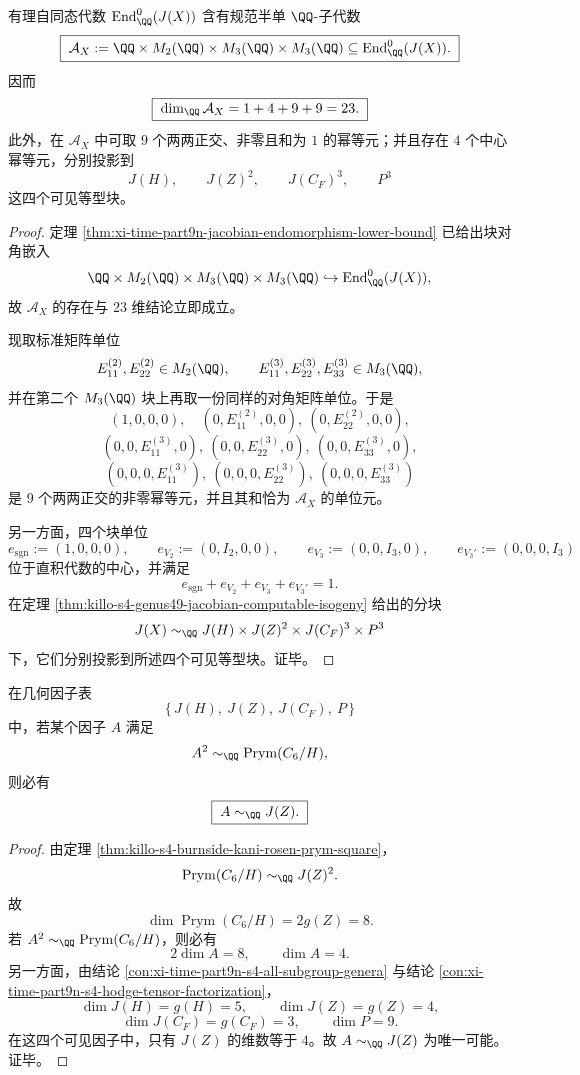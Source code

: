 \begin{theorem}\label{thm:xi-time-part9n1b-jacobian-projector-idempotent-algebra}
有理自同态代数 \(\operatorname{End}^0_{\QQ}(J(X))\) 含有规范半单 \(\QQ\)-子代数
\[
\boxed{\;
\mathcal A_X:=\QQ\times M_2(\QQ)\times M_3(\QQ)\times M_3(\QQ)
\subseteq \operatorname{End}^0_{\QQ}(J(X)).\;}
\]
因而
\[
\boxed{\;\dim_{\QQ}\mathcal A_X=1+4+9+9=23.\;}
\]
此外，在 \(\mathcal A_X\) 中可取 \(9\) 个两两正交、非零且和为 \(1\) 的幂等元；并且存在 \(4\) 个中心幂等元，分别投影到
\[
J(H),\qquad J(Z)^2,\qquad J(C_F)^3,\qquad P^3
\]
这四个可见等型块。
\end{theorem}
\begin{proof}
定理 \ref{thm:xi-time-part9n-jacobian-endomorphism-lower-bound} 已给出块对角嵌入
\[
\QQ\times M_2(\QQ)\times M_3(\QQ)\times M_3(\QQ)
\hookrightarrow
\operatorname{End}^0_{\QQ}(J(X)),
\]
故 \(\mathcal A_X\) 的存在与 \(23\) 维结论立即成立。

现取标准矩阵单位
\[
E_{11}^{(2)},E_{22}^{(2)}\in M_2(\QQ),
\qquad
E_{11}^{(3)},E_{22}^{(3)},E_{33}^{(3)}\in M_3(\QQ),
\]
并在第二个 \(M_3(\QQ)\) 块上再取一份同样的对角矩阵单位。于是
\[
(1,0,0,0),
\quad
(0,E_{11}^{(2)},0,0),\ (0,E_{22}^{(2)},0,0),
\]
\[
(0,0,E_{11}^{(3)},0),\ (0,0,E_{22}^{(3)},0),\ (0,0,E_{33}^{(3)},0),
\]
\[
(0,0,0,E_{11}^{(3)}),\ (0,0,0,E_{22}^{(3)}),\ (0,0,0,E_{33}^{(3)})
\]
是 \(9\) 个两两正交的非零幂等元，并且其和恰为 \(\mathcal A_X\) 的单位元。

另一方面，四个块单位
\[
e_{\mathrm{sgn}}:=(1,0,0,0),\qquad
e_{V_2}:=(0,I_2,0,0),\qquad
e_{V_3}:=(0,0,I_3,0),\qquad
e_{V_3'}:=(0,0,0,I_3)
\]
位于直积代数的中心，并满足
\[
e_{\mathrm{sgn}}+e_{V_2}+e_{V_3}+e_{V_3'}=1.
\]
在定理 \ref{thm:killo-s4-genus49-jacobian-computable-isogeny} 给出的分块
\[
J(X)\sim_{\QQ}J(H)\times J(Z)^2\times J(C_F)^3\times P^3
\]
下，它们分别投影到所述四个可见等型块。证毕。
\end{proof}

\begin{corollary}\label{cor:xi-time-part9n1b-prym-c6h-unique-square-root}
在几何因子表
\[
\{\,J(H),\ J(Z),\ J(C_F),\ P\,\}
\]
中，若某个因子 \(A\) 满足
\[
A^2\sim_{\QQ}\operatorname{Prym}(C_6/H),
\]
则必有
\[
\boxed{\;A\sim_{\QQ}J(Z).\;}
\]
\end{corollary}
\begin{proof}
由定理 \ref{thm:killo-s4-burnside-kani-rosen-prym-square}，
\[
\operatorname{Prym}(C_6/H)\sim_{\QQ}J(Z)^2.
\]
故
\[
\dim\operatorname{Prym}(C_6/H)=2g(Z)=8.
\]
若 \(A^2\sim_{\QQ}\operatorname{Prym}(C_6/H)\)，则必有
\[
2\dim A=8,
\qquad
\dim A=4.
\]
另一方面，由结论 \ref{con:xi-time-part9n-s4-all-subgroup-genera} 与结论 \ref{con:xi-time-part9n-s4-hodge-tensor-factorization}，
\[
\dim J(H)=g(H)=5,\qquad
\dim J(Z)=g(Z)=4,
\]
\[
\dim J(C_F)=g(C_F)=3,\qquad
\dim P=9.
\]
在这四个可见因子中，只有 \(J(Z)\) 的维数等于 \(4\)。故 \(A\sim_{\QQ}J(Z)\) 为唯一可能。证毕。
\end{proof}

\endinput
